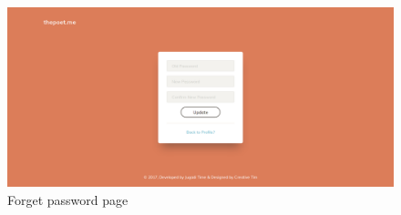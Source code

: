 \begin{figure}
    \centering \includegraphics[scale=0.35]{images/app/poetuserchangepwd-fullpage.png}
    \caption{Forget password page}
    \label{poet7}
\end{figure}



%



